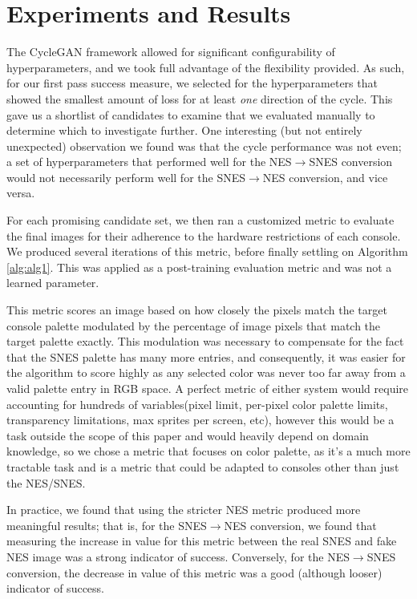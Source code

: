 \documentclass[10pt,twocolumn,letterpaper]{article}
\begin{document}
\section{Experiments and Results}


The CycleGAN framework allowed for significant configurability of hyperparameters, and we took full advantage of the flexibility provided. As such, for our first pass success measure, we selected for the hyperparameters that showed the smallest amount of loss for at least \textit{one} direction of the cycle. This gave us a shortlist of candidates to examine that we evaluated manually to determine which to investigate further. One interesting (but not entirely unexpected) observation we found was that the cycle performance was not even; a set of hyperparameters that performed well for the NES$\rightarrow$SNES conversion would not necessarily perform well for the SNES$\rightarrow$NES conversion, and vice versa.

For each promising candidate set, we then ran a customized metric to evaluate the final images for their adherence to the hardware restrictions of each console. We produced several iterations of this metric, before finally settling on Algorithm \ref{alg:alg1}. This was applied as a post-training evaluation metric and was not a learned parameter.

This metric scores an image based on how closely the pixels match the target console palette modulated by the percentage of image pixels that match the target palette exactly. This modulation was necessary to compensate for the fact that the SNES palette has many more entries, and consequently, it was easier for the algorithm to score highly as any selected color was never too far away from a valid palette entry in RGB space. A perfect metric of either system would require accounting for hundreds of variables(pixel limit, per-pixel color palette limits, transparency limitations, max sprites per screen, etc), however this would be a task outside the scope of this paper and would heavily depend on domain knowledge, so we chose a metric that focuses on color palette, as it's a much more tractable task and is a metric that could be adapted to consoles other than just the NES/SNES.

In practice, we found that using the stricter NES metric produced more meaningful results; that is, for the SNES$\rightarrow$NES conversion, we found that measuring the increase in value for this metric between the real SNES and fake NES image was a strong indicator of success. Conversely, for the NES$\rightarrow$SNES conversion, the decrease in value of this metric was a good (although looser) indicator of success.
\end{document}
